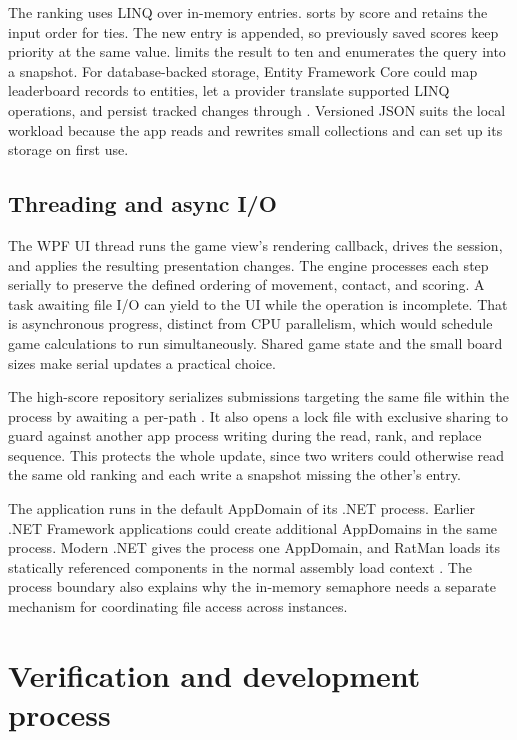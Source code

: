 The ranking uses LINQ over in-memory entries.  sorts by score and retains the input order for ties. The new entry is appended, so previously saved scores keep priority at the same value.  limits the result to ten and  enumerates the query into a snapshot. For database-backed storage, Entity Framework Core could map leaderboard records to entities, let a provider translate supported LINQ operations, and persist tracked changes through  \cite{ef-query,ef-save}. Versioned JSON suits the local workload because the app reads and rewrites small collections and can set up its storage on first use.

\clearpage
\subsection{Threading and async I/O}

The WPF UI thread runs the game view's rendering callback, drives the session, and applies the resulting presentation changes. The engine processes each step serially to preserve the defined ordering of movement, contact, and scoring. A task awaiting file I/O can yield to the UI while the operation is incomplete. That is asynchronous progress, distinct from CPU parallelism, which would schedule game calculations to run simultaneously. Shared game state and the small board sizes make serial updates a practical choice.

The high-score repository serializes submissions targeting the same file within the process by awaiting a per-path . It also opens a lock file with exclusive sharing to guard against another app process writing during the read, rank, and replace sequence. This protects the whole update, since two writers could otherwise read the same old ranking and each write a snapshot missing the other's entry.

The application runs in the default AppDomain of its .NET process. Earlier .NET Framework applications could create additional AppDomains in the same process. Modern .NET gives the process one AppDomain, and RatMan loads its statically referenced components in the normal assembly load context \cite{domains}. The process boundary also explains why the in-memory semaphore needs a separate mechanism for coordinating file access across instances.

\clearpage
\section{Verification and development process}

